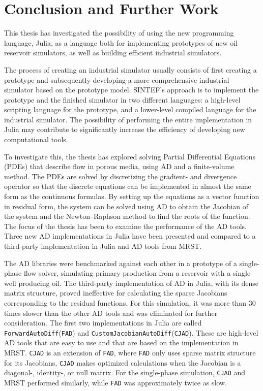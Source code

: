 \chapter{Conclusion and Further Work}
\label{ch:Conclusion}
This thesis has investigated the possibility of using the new programming language, Julia, as a language both for implementing prototypes of new oil reservoir simulators, as well as building efficient industrial simulators. 

The process of creating an industrial simulator usually consists of first creating a prototype and subsequently developing a more comprehensive industrial simulator based on the prototype model. SINTEF's approach is to implement the prototype and the finished simulator in two different languages: a high-level scripting language for the prototype, and a lower-level compiled language for the industrial simulator. The possibility of performing the entire implementation in Julia may contribute to significantly increase the efficiency of developing new computational tools.

To investigate this, the thesis has explored solving Partial Differential Equations (PDEs) that describe flow in porous media, using AD and a finite-volume method. The PDEs are solved by discretizing the gradient- and divergence operator so that the discrete equations can be implemented in almost the same form as the continuous formulas. By setting up the equations as a vector function in residual form, the system can be solved using AD to obtain the Jacobian of the system and the Newton--Raphson method to find the roots of the function. The focus of the thesis has been to examine the performance of the AD tools. Three new AD implementations in Julia have been presented and compared to a third-party implementation in Julia and AD tools from MRST. 

The AD libraries were benchmarked against each other in a prototype of a single-phase flow solver, simulating primary production from a reservoir with a single well producing oil. The third-party implementation of AD in Julia, with its dense matrix structure, proved ineffective for calculating the sparse Jacobians corresponding to the residual functions. For this simulation, it was more than 30 times slower than the other AD tools and was eliminated for further consideration. The first two implementations in Julia are called \texttt{ForwardAutoDiff}(\texttt{FAD}) and \texttt{CustomJacobianAutoDiff}(\texttt{CJAD}). These are high-level AD tools that are easy to use and that are based on the implementation in MRST. \texttt{CJAD} is an extension of \texttt{FAD}, where \texttt{FAD} only uses sparse matrix structure for its Jacobians, \texttt{CJAD} makes optimized calculations when the Jacobian is a diagonal-, identity-, or null matrix. For the single-phase simulation, \texttt{CJAD} and MRST performed similarly, while \texttt{FAD} was approximately twice as slow. 

